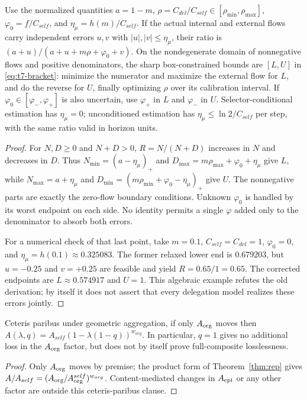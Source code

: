 \begin{proposition}\label{prop:bracket}
Use the normalized quantities $a=1-m$,
$\rho=C_{del}/C_{self}\in[\rho_{\min},\rho_{\max}]$,
$\varphi_0=f/C_{self}$, and $\eta_\mu=h(m)/C_{self}$. If the actual internal
and external flows carry independent errors $u,v$ with
$|u|,|v|\le\eta_\mu$, their ratio is $(a+u)/(a+u+m\rho+\varphi_0+v)$. On the
nondegenerate domain of nonnegative flows and positive denominators, the
sharp box-constrained bounds are $[L,U]$ in \eqref{eq:t7-bracket}: minimize
the numerator and maximize the external flow for $L$, and do the reverse for
$U$, finally optimizing $\rho$ over its calibration interval. If
$\varphi_0\in[\varphi_-,\varphi_+]$ is also uncertain, use $\varphi_+$ in $L$
and $\varphi_-$ in $U$. Selector-conditional estimation has $\eta_\mu=0$;
unconditioned estimation has $\eta_\mu\le\ln2/C_{self}$ per step, with the
same ratio valid in horizon units.
\end{proposition}
\begin{proof}
For $N,D\ge0$ and $N+D>0$, $R=N/(N+D)$ increases in $N$ and decreases in $D$.
Thus $N_{\min}=(a-\eta_\mu)_+$ and
$D_{\max}=m\rho_{\max}+\varphi_0+\eta_\mu$ give $L$, while
$N_{\max}=a+\eta_\mu$ and
$D_{\min}=(m\rho_{\min}+\varphi_0-\eta_\mu)_+$ give $U$. The nonnegative
parts are exactly the zero-flow boundary conditions. Unknown $\varphi_0$ is
handled by its worst endpoint on each side. No identity permits a single
$\varphi$ added only to the denominator to absorb both errors.

For a numerical check of that last point, take $m=0.1$,
$C_{self}=C_{del}=1$, $\varphi_0=0$, and
$\eta_\mu=h(0.1)\approx0.325083$. The former relaxed lower end is
$0.679203$, but $u=-0.25$ and $v=+0.25$ are feasible and yield
$R=0.65/1=0.65$. The corrected endpoints are $L\approx0.574917$ and $U=1$.
This algebraic example refutes the old derivation; by itself it does not
assert that every delegation model realizes these errors jointly.
\end{proof}

\begin{corollary}
Ceteris paribus under geometric aggregation, if only $A_{\mathrm{org}}$ moves then
$A(\lambda,q)=A_{self}(1-\lambda(1-q))^{w_{org}}$. In particular, $q=1$
gives no additional loss in the $A_{\mathrm{org}}$ factor, but does not by itself
prove full-composite losslessness.
\end{corollary}
\begin{proof}
Only $A_{\mathrm{org}}$ moves by premise; the product form of Theorem~\ref{thm:rep}
gives $A/A_{self}=(A_{\mathrm{org}}/A_{\mathrm{org}}^{self})^{w_{org}}$. Content-mediated changes
in $A_{\mathrm{epi}}$ or any other factor are outside this ceteris-paribus clause.
\end{proof}

